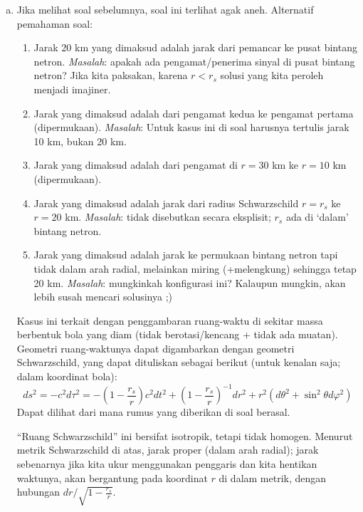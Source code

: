 \documentclass[11pt,fleqn]{exam}
\begin{document}
\begin{questions}
\begin{enumerate}[a.]
	\item Jika melihat soal sebelumnya, soal ini terlihat agak aneh. Alternatif pemahaman soal:
	\begin{enumerate}[1).]
		\item Jarak 20 km yang dimaksud adalah jarak dari pemancar ke pusat bintang netron. \textit{Masalah}: apakah ada pengamat/penerima sinyal di pusat bintang netron? Jika kita paksakan, karena $r < r_s$ solusi yang kita peroleh menjadi imajiner.
		\item Jarak yang dimaksud adalah dari pengamat kedua ke pengamat pertama (dipermukaan). \textit{Masalah}: Untuk kasus ini di soal harusnya tertulis jarak 10 km, bukan 20 km.
		\item Jarak yang dimaksud adalah dari pengamat di $r=30$ km ke $r=10$ km (dipermukaan).
		\item Jarak yang dimaksud adalah jarak dari radius Schwarzschild $r=r_s$ ke $r=20$ km. \textit{Masalah}: tidak disebutkan secara eksplisit; $r_s$ ada di `dalam' bintang netron.
		\item Jarak yang dimaksud adalah jarak ke permukaan bintang netron tapi tidak dalam arah radial, melainkan miring (+melengkung) sehingga tetap 20 km. \textit{Masalah}: mungkinkah konfigurasi ini? Kalaupun mungkin, akan lebih susah mencari solusinya ;)
	\end{enumerate}
	
	
	Kasus ini terkait dengan penggambaran ruang-waktu di sekitar massa berbentuk bola yang diam (tidak berotasi/kencang + tidak ada muatan). Geometri ruang-waktunya dapat digambarkan dengan geometri Schwarzschild, yang dapat dituliskan sebagai berikut (untuk kenalan saja; dalam koordinat bola):
	\begin{equation*}
		ds^2 = -c^2 d\tau^2 = - \left( 1 - \frac{r_s}{r} \right) c^2 dt^2 + \left(1 - \frac{r_s}{r} \right)^{-1} dr^2 + r^2 \left( d\theta^2 + \sin^2\theta d\varphi^2 \right)
	\end{equation*}
	Dapat dilihat dari mana rumus yang diberikan di soal berasal.
	
	``Ruang  Schwarzschild'' ini bersifat isotropik, tetapi tidak homogen. Menurut metrik Schwarzschild di atas, jarak proper (dalam arah radial); jarak sebenarnya jika kita ukur menggunakan penggaris dan kita hentikan waktunya, akan bergantung pada koordinat $r$ di dalam metrik, dengan hubungan $dr / \sqrt{1 - \frac{r_s}{r}}$. 
	

\end{enumerate}
\end{questions}
\end{document}
